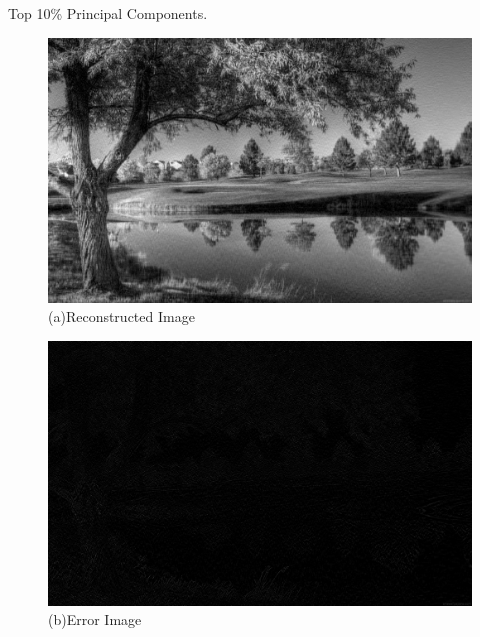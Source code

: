 \documentclass[a4 paper]{article}
\begin{document}
Top 10\% Principal Components.\\
\begin{figure}[!htb]
    \centering
    \begin{minipage}{0.49\textwidth}
        \centering
        \includegraphics[width=1\textwidth]{R10.png} \\
         (a)Reconstructed Image
    \end{minipage}\hfill
    \begin{minipage}{0.49\textwidth}
        \centering
        \includegraphics[width=1\textwidth]{E10.png}\\
         (b)Error Image
    \end{minipage}
    \label{fig:l}
\end{figure}
\end{document}
